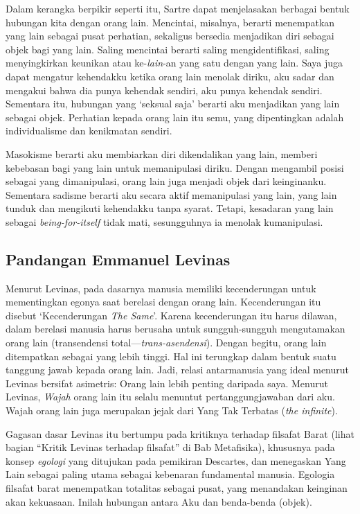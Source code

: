 \documentclass[11pt,twoside,a5paper,openany]{memoir}
\begin{document}
Dalam kerangka berpikir seperti itu, Sartre dapat menjelasakan berbagai
bentuk hubungan kita dengan orang lain. Mencintai, misalnya, berarti
menempatkan yang lain sebagai pusat perhatian, sekaligus bersedia
menjadikan diri sebagai objek bagi yang lain. Saling mencintai berarti
saling mengidentifikasi, saling menyingkirkan keunikan atau
ke-\emph{lain}-an yang satu dengan yang lain. Saya juga dapat mengatur
kehendakku ketika orang lain menolak diriku, aku sadar dan mengakui
bahwa dia punya kehendak sendiri, aku punya kehendak sendiri. Sementara
itu, hubungan yang `seksual saja' berarti aku menjadikan yang lain
sebagai objek. Perhatian kepada orang lain itu semu, yang dipentingkan
adalah individualisme dan kenikmatan sendiri.

Masokisme berarti aku membiarkan diri dikendalikan yang lain, memberi
kebebasan bagi yang lain untuk memanipulasi diriku. Dengan mengambil
posisi sebagai yang dimanipulasi, orang lain juga menjadi objek dari
keinginanku. Sementara sadisme berarti aku secara aktif memanipulasi
yang lain, yang lain tunduk dan mengikuti kehendakku tanpa syarat.
Tetapi, kesadaran yang lain sebagai \emph{being-for-itself} tidak mati,
sesungguhnya ia menolak kumanipulasi.

\hypertarget{pandangan-emmanuel-levinas}{%
\subsection{Pandangan Emmanuel
Levinas}\label{pandangan-emmanuel-levinas}}

Menurut Levinas, pada dasarnya manusia memiliki kecenderungan untuk
mementingkan egonya saat berelasi dengan orang lain. Kecenderungan itu
disebut `Kecenderungan \emph{The Same}'. Karena kecenderungan itu harus
dilawan, dalam berelasi manusia harus berusaha untuk sungguh-sungguh
mengutamakan orang lain (transendensi total---\emph{trans-asendensi}).
Dengan begitu, orang lain ditempatkan sebagai yang lebih tinggi. Hal ini
terungkap dalam bentuk suatu tanggung jawab kepada orang lain. Jadi,
relasi antarmanusia yang ideal menurut Levinas bersifat asimetris: Orang
lain lebih penting daripada saya. Menurut Levinas, \emph{Wajah} orang
lain itu selalu menuntut pertanggungjawaban dari aku. Wajah orang lain
juga merupakan jejak dari Yang Tak Terbatas (\emph{the infinite}).

Gagasan dasar Levinas itu bertumpu pada kritiknya terhadap filsafat
Barat (lihat bagian ``Kritik Levinas terhadap filsafat'' di Bab
Metafisika), khususnya pada konsep \emph{egologi} yang ditujukan pada
pemikiran Descartes, dan menegaskan Yang Lain sebagai paling utama
sebagai kebenaran fundamental manusia. Egologia filsafat barat
menempatkan totalitas sebagai pusat, yang menandakan keinginan akan
kekuasaan. Inilah hubungan antara Aku dan benda-benda (objek).
\end{document}
